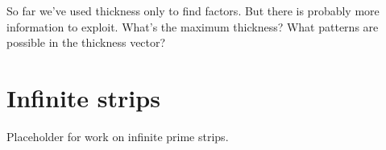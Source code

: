 \documentclass[10pt]{article}
\numberwithin{equation}{section}
\newenvironment{anote}
               {{\textcolor{blue}{Note:}}
                 \itshape
               }
               {}
\begin{document}
\begin{anote}
So far we've used thickness only to find factors. But there is
probably more information to exploit. What's the maximum thickness?
What patterns are possible in the thickness vector?
\end{anote}

\section{Infinite strips}

\begin{anote}
Placeholder for work on infinite prime strips.
\end{anote}

%
\end{document}
